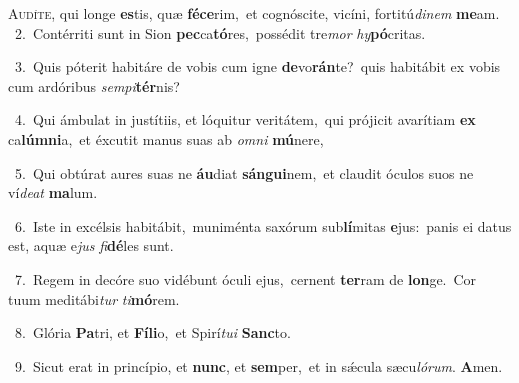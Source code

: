 \lettrine{\initial\textcolor{\initialcolor}{A}}{udíte,} qui longe \textbf{es}\-tis, quæ \textbf{fé}\-\textbf{ce}rim,~\star et cognóscite, vicíni, fortitú\-\textit{di}\-\textit{nem} \textbf{me}\-am.\\
{\numbfont\textcolor{\numbcolor}{~2.}}~Contérriti sunt in Sion \textbf{pec}\-ca\-\textbf{tó}\-res,~\star possédit tre\textit{mor} \textit{hy}\-\textbf{pó}critas.\par
{\numbfont\textcolor{\numbcolor}{~3.}}~Quis póterit habitáre de vobis cum igne \textbf{de}\-vo\-\textbf{rán}\-te?~\star quis habitábit ex vobis cum ardóribus \textit{sem}\-\textit{pi}\textbf{tér}nis?\par
{\numbfont\textcolor{\numbcolor}{~4.}}~Qui ámbulat in justítiis, et lóquitur veritátem,~\dagger qui prójicit avarítiam \textbf{ex} ca\-\textbf{lúm}\-\textbf{ni}a,~\star et éxcutit manus suas ab \textit{om}\-\textit{ni} \textbf{mú}\-nere,\par
{\numbfont\textcolor{\numbcolor}{~5.}}~Qui obtúrat aures suas ne \textbf{áu}\-diat \textbf{sán}\-\textbf{gui}nem,~\star et claudit óculos suos ne ví\-\textit{de}\-\textit{at} \textbf{ma}\-lum.\par
{\numbfont\textcolor{\numbcolor}{~6.}}~Iste in excélsis habitábit,~\dagger muniménta saxórum sub\-\textbf{lí}\-mitas \textbf{e}\-jus:~\star panis ei datus est, aquæ e\textit{jus} \textit{fi}\-\textbf{dé}les sunt.\par
{\numbfont\textcolor{\numbcolor}{~7.}}~Regem in decóre suo vidébunt óculi ejus,~\dagger cernent \textbf{ter}\-ram de \textbf{lon}\-ge.~\star Cor tuum meditábi\textit{tur} \textit{ti}\-\textbf{mó}rem.\par
{\numbfont\textcolor{\numbcolor}{~8.}}~Glória \textbf{Pa}\-tri, et \textbf{Fí}\-\textbf{li}o,~\star et Spirí\-\textit{tu}\-\textit{i} \textbf{Sanc}\-to.\par
{\numbfont\textcolor{\numbcolor}{~9.}}~Sicut erat in princípio, et \textbf{nunc}\-, et \textbf{sem}\-per,~\star et in sǽcula sæcu\-\textit{ló}\-\textit{rum}. \textbf{A}\-men.\par
